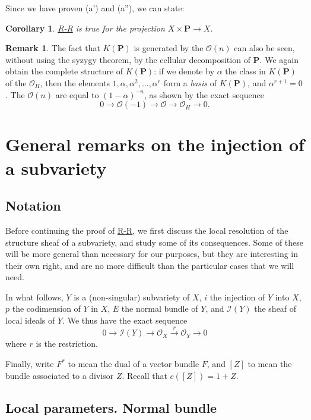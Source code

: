 \documentclass{article}
\theoremstyle{plain}
\newtheorem*{corollary}{Corollary}
\theoremstyle{definition}
\newtheorem*{remark}{Remark}
\newcommand{\sh}[1]{{\mathscr{#1}}}
\newcommand{\PP}{\mathbf{P}}
\newcommand{\oldpage}[1]{\marginpar{\footnotesize$\Big\vert$ \textit{p.~#1}}}
\begin{document}
Since we have proven (a') and (a''), we can state:

\begin{corollary}
  \hyperref[theoremriemannroch]{R-R} is true for the projection $X\times\PP\to X$.
\end{corollary}

\begin{remark}
  The fact that $K(\PP)$ is generated by the $\sh{O}(n)$ can also be seen, without using the syzygy theorem, by the cellular decomposition of $\PP$.
  We again obtain the complete structure of $K(\PP)$:
  if we denote by $\alpha$ the class in $K(\PP)$ of the $\sh{O}_H$, then the elements $1,\alpha,\alpha^2,\ldots,\alpha^r$ form a \emph{basis} of $K(\PP)$, and $\alpha^{r+1}=0$.
  The $\sh{O}(n)$ are equal to $(1-\alpha)^{-n}$, as shown by the exact sequence
  \[
    0 \to \sh{O}(-1) \to \sh{O} \to \sh{O}_H \to 0.
  \]
\end{remark}


\section{General remarks on the injection of a subvariety}
\label{section10}


\subsection{Notation}
\label{subsection10a}

\oldpage{120}
Before continuing the proof of \hyperref[theoremriemannroch]{R-R}, we first discuss the local resolution of the structure sheaf of a subvariety, and study some of its consequences.
Some of these will be more general than necessary for our purposes, but they are interesting in their own right, and are no more difficult than the particular cases that we will need.

In what follows, $Y$ is a (non-singular) subvariety of $X$, $i$ the injection of $Y$ into $X$, $p$ the codimension of $Y$ in $X$, $E$ the normal bundle of $Y$, and $\sh{I}(Y)$ the sheaf of local ideals of $Y$.
We thus have the exact sequence
\[
\label{section10aequation1}
  0 \to \sh{I}(Y) \to \sh{O}_X \xrightarrow{r} \sh{O}_Y \to 0
  \tag{1}
\]
where $r$ is the restriction.

Finally, write $F^*$ to mean the dual of a vector bundle $F$, and $[Z]$ to mean the bundle associated to a divisor $Z$.
Recall that $c([Z])=1+Z$.


\subsection{Local parameters. Normal bundle}
\label{subsection10b}
\end{document}
